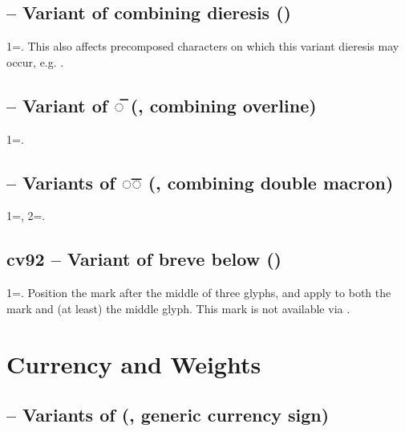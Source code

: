 \subsection{ -- Variant of combining dieresis ()}
1=. This also affects precomposed characters on which this variant dieresis may occur, e.g.
.

\subsection{ -- Variant of ◌̅ (,
combining overline)}
1=.

\subsection{ -- Variants of ◌͞◌ (, combining double macron)}
1=, 2=.

\subsection{cv92 -- Variant of breve
below ()}
1=. Position the mark after the middle of three glyphs, and apply 
to both the mark and (at least) the middle glyph. This mark is not available via .

\section{Currency and Weights}
\subsection{ -- Variants of {\textcurrency} (, generic
currency sign)}

